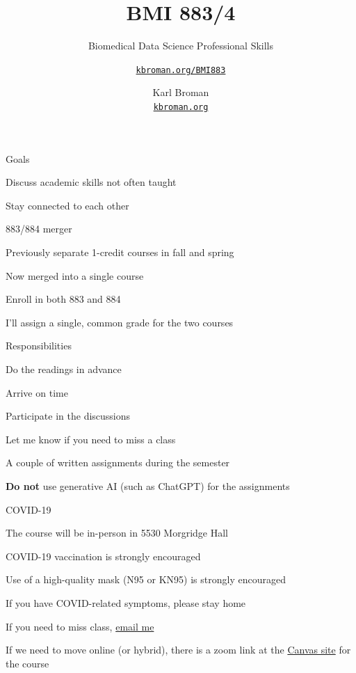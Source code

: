 \documentclass[aspectratio=169,12pt,t]{beamer}
\title{BMI 883/4}
\subtitle{Biomedical Data Science Professional Skills}
\author{\href{https://kbroman.org/BMI883}{\tt kbroman.org/BMI883} }
\institute{}
\date{\small \hspace{3in} Karl Broman \\
  \hspace{3in} \href{https://kbroman.org}{\color{foreground}
    \small \tt kbroman.org}}
\begin{document}
{
\frame{
  \titlepage
} }




\begin{frame}{Goals}

  \bbi
\item Discuss academic skills not often taught
\item Stay connected to each other
  \ei

\end{frame}




\begin{frame}{883/884 merger}

  \bbi
\item Previously separate 1-credit courses in fall and spring
\item Now merged into a single course
\item Enroll in both 883 and 884
\item I'll assign a single, common grade for the two courses
  \ei

\end{frame}




\begin{frame}{Responsibilities}

  \bbi
\item Do the readings in advance
\item Arrive on time
\item Participate in the discussions
\item Let me know if you need to miss a class
\item A couple of written assignments during the semester
\item {\bf Do not} use generative AI (such as ChatGPT) for the assignments
  \ei

\end{frame}



\begin{frame}{COVID-19}

  \bbi
\item The course will be in-person in 5530 Morgridge Hall
\item COVID-19 vaccination is strongly encouraged
\item Use of a high-quality mask (N95 or KN95) is strongly encouraged
\item If you have COVID-related symptoms, please stay home
\item If you need to miss class, \href{mailto:broman@wisc.edu}{email me}
\item If we need to move online (or hybrid), there is a zoom link at
  the \href{https://canvas.wisc.edu/courses/529569}{Canvas site} for the course
  \ei

\end{frame}
\end{document}
